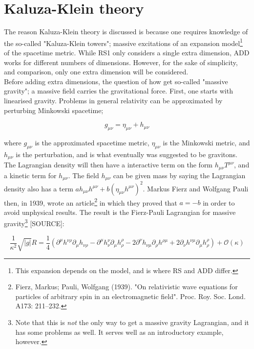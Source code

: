 \documentclass[11pt,a4paper]{article}
\begin{document}
\section{Kaluza-Klein theory}
The reason Kaluza-Klein theory is discussed is because one requires knowledge of the so-called "Kaluza-Klein towers"; massive excitations of an expansion model\footnote{This expansion depends on the model, and is where RS and ADD differ.} of the spacetime metric. While RS1 only considers a single extra dimension, ADD works for different numbers of dimensions. However, for the sake of simplicity, and comparison, only one extra dimension will be considered.\\
Before adding extra dimensions, the question of how get so-called "massive gravity"; a massive field carries the gravitational force. First, one starts with linearised gravity. Problems in general relativity can be approximated by perturbing Minkowski spacetime;

\begin{equation}
	g_{\mu\nu} = \eta_{\mu\nu} + h_{\mu\nu}
\end{equation}

where $g_{\mu\nu}$ is the approximated spacetime metric, $\eta_{\mu\nu}$ is the Minkowski metric, and $h_{\mu\nu}$ is the perturbation, and is what eventually was suggested to be gravitons. The Lagrangian density will then have a interactive term on the form $h_{\mu\nu}T^{\mu\nu}$, and a kinetic term for $h_ {\mu\nu}$. The field $h_{\mu\nu}$ can be given mass by saying the Lagrangian density also has a term $ah_{\mu\nu}h^{\mu\nu} + b(\eta_{\mu\nu}h^{\mu\nu})^2$. Markus Fierz and Wolfgang Pauli then, in 1939, wrote an article\footnote{Fierz, Markus; Pauli, Wolfgang (1939). "On relativistic wave equations for particles of arbitrary spin in an electromagnetic field". Proc. Roy. Soc. Lond. A173: 211–232.} in which they proved that $a=-b$ in order to avoid unphysical results. The result is the Fierz-Pauli Lagrangian for massive gravity\footnote{Note that this is \emph{not} the only way to get a massive gravity Lagrangian, and it has some problems as well. It serves well as an introductory example, however.} [SOURCE]:

\begin{equation}
	\frac{1}{\kappa^2}\sqrt{|g|}R = \frac{1}{4}\left( \partial^\mu h^{\nu\rho}\partial_\mu h_{\nu\rho} - \partial^\mu h^{\nu}_{\nu}\partial_\mu h^\rho_{\rho} - 2\partial^\nu h_{\nu\mu}\partial_\rho h^{\rho\mu} + 2\partial_\nu h^{\nu\mu}\partial_\mu h^{\rho}_{\rho} \right) + \mathcal{O}(\kappa)
	\label{eq:FierzPauli}
\end{equation}
\end{document}

